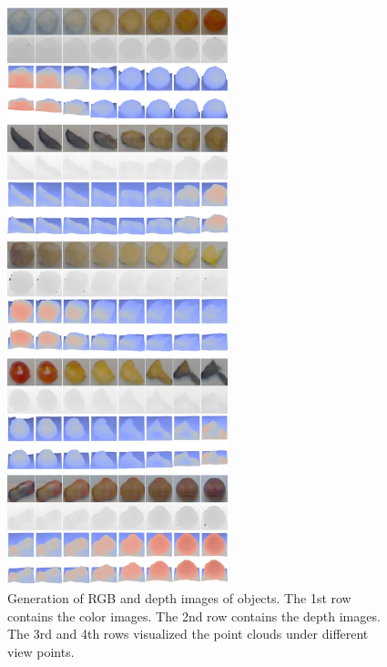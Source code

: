\begin{figure}[tbh!]
\centering
\includegraphics[trim=0in 0in 0in 0in, width=0.57\textwidth]{result_rgbd_big1.pdf}
\caption{Generation of RGB and depth images of objects. The 1st row contains the color images. The 2nd row contains the depth images. The 3rd and 4th rows visualized the point clouds under different view points.}
\label{fig::result_rgbd1}
\end{figure}

